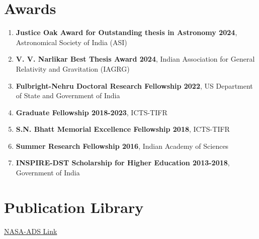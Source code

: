 	\section{Awards}
		\begin{enumerate}[leftmargin=*]
                \item \textbf{Justice Oak Award for Outstanding thesis in Astronomy 2024}, Astronomical Society of India (ASI)
                \item \textbf{V. V. Narlikar Best Thesis Award 2024}, {Indian Association for General Relativity and Gravitation (IAGRG)}
			\item  \textbf{Fulbright-Nehru Doctoral Research Fellowship 2022}, US Department of State and Government of India
			\item \textbf{Graduate Fellowship 2018-2023}, ICTS-TIFR
			\item \textbf{S.N. Bhatt Memorial Excellence Fellowship 2018}, ICTS-TIFR
			\item \textbf{Summer Research Fellowship 2016},  Indian Academy of Sciences
			\item \textbf{INSPIRE-DST Scholarship for Higher Education 2013-2018}, Government of India
		\end{enumerate}

            \section{Publication Library}
            \href{https://ui.adsabs.harvard.edu/public-libraries/LqJDfKCTTdeuL_Inb7SwVw}{NASA-ADS Link}
		

